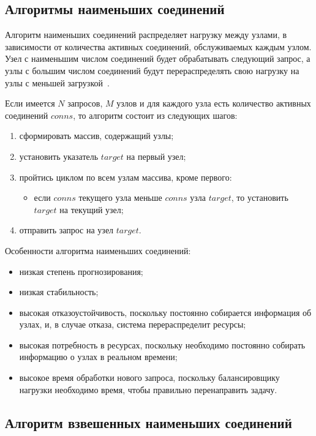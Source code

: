 \subsection{Алгоритмы наименьших соединений}

Алгоритм наименьших соединений распределяет нагрузку между узлами, в зависимости от количества активных соединений, обслуживаемых каждым узлом.
Узел с наименьшим числом соединений будет обрабатывать следующий запрос, а узлы с большим числом соединений будут перераспределять свою нагрузку на узлы с меньшей загрузкой~\cite{leastconnection}.

Если имеется $N$ запросов, $M$ узлов и для каждого узла есть количество активных соединений $conns$, то алгоритм состоит из следующих шагов:
\begin{enumerate}
	\item сформировать массив, содержащий узлы;
	\item установить указатель $target$ на первый узел;
	\item пройтись циклом по всем узлам массива, кроме первого:
	\begin{itemize}
		\item если $conns$ текущего узла меньше $conns$ узла $target$, то установить $target$ на текущий узел; 
	\end{itemize}
	\item отправить запрос на узел $target$.
\end{enumerate}

Особенности алгоритма наименьших соединений:
\begin{itemize}
	\item низкая степень прогнозирования; 
	\item низкая стабильность;
	\item высокая отказоустойчивость, поскольку постоянно собирается информация об узлах, и, в случае отказа, система перераспределит ресурсы;
	\item высокая потребность в ресурсах, поскольку необходимо постоянно собирать информацию о узлах в реальном времени;
	\item высокое время обработки нового запроса, поскольку балансировщику нагрузки необходимо время, чтобы правильно перенаправить задачу.
\end{itemize}

\subsection*{Алгоритм взвешенных наименьших соединений}

